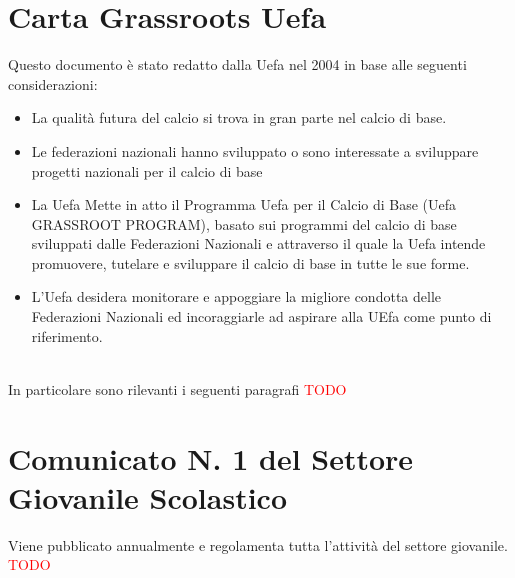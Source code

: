 \documentclass[../uefaC.tex]{subfiles}
\begin{document}
\section{Carta Grassroots Uefa}
Questo documento è stato redatto dalla Uefa nel 2004 in base alle seguenti considerazioni: \hfill \\
\begin{itemize}
    \item{La qualità futura del calcio si trova in gran parte nel calcio di base.}
    \item{Le federazioni nazionali hanno sviluppato o sono interessate a sviluppare progetti nazionali per il calcio di base}
    \item{La Uefa Mette in atto il Programma Uefa per il Calcio di Base (Uefa GRASSROOT PROGRAM), basato sui programmi del calcio di base sviluppati dalle Federazioni Nazionali e attraverso il quale la Uefa intende promuovere, tutelare e sviluppare il calcio di base in tutte le sue forme.}
    \item{L'Uefa desidera monitorare e appoggiare la migliore condotta delle Federazioni Nazionali ed incoraggiarle ad aspirare alla UEfa come punto di riferimento.}
\end{itemize}
\hfill \\
In particolare sono rilevanti i seguenti paragrafi \textcolor{red}{TODO}


\section{Comunicato N. 1 del Settore Giovanile Scolastico}

Viene pubblicato annualmente e regolamenta tutta l'attività del settore giovanile. \textcolor{red}{TODO}
\end{document}
